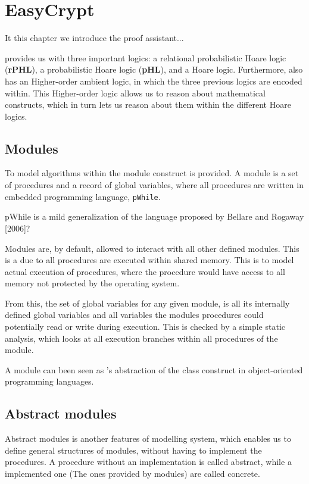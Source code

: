 \section{EasyCrypt}
\label{sec:EasyCrypt}

It this chapter we introduce the \easycrypt proof assistant...

\easycrypt provides us with three important logics: a relational probabilistic
Hoare logic (\textbf{rPHL}), a probabilistic Hoare logic (\textbf{pHL}), and a
Hoare logic.
Furthermore, \easycrypt also has an Higher-order ambient logic, in which the three
previous logics are encoded within. This Higher-order logic allows us to reason
about mathematical constructs, which in turn lets us reason about them within
the different Hoare logics.

\subsection{Modules}
\label{subsec:ec_modules}
To model algorithms within \easycrypt the module construct is provided.
A module is a set of procedures and a record of global variables, where all
procedures are written in \easycrypt embedded programming language, \texttt{pWhile}.
\begin{draft}
pWhile is a mild generalization of the language proposed by Bellare and Rogaway [2006]?
\end{draft}

Modules are, by default, allowed to interact with all other defined modules.
This is a due to all procedures are executed within shared memory. This is to
model actual execution of procedures, where the procedure would have access to
all memory not protected by the operating system.

From this, the set of global variables for any given module, is all its
internally defined global variables and all variables the modules procedures
could potentially read or write during execution. This is checked by a simple
static analysis, which looks at all execution branches within all procedures of the module.

A module can been seen as \easycrypt's abstraction of the class construct
in object-oriented programming languages.


\subsection{Abstract modules}
\label{subsec:ec_abs_modules}
Abstract modules is another features of \easycrypt modelling system, which
enables us to define general structures of modules, without having to implement
the procedures. A procedure without an implementation is called abstract, while
a implemented one (The ones provided by modules) are called concrete.

